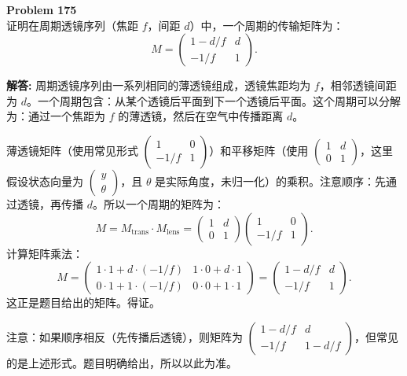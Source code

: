 \documentclass[12pt, a4paper, oneside]{ctexart}
\newenvironment{solution}{\par\noindent\textbf{解答:}\quad}{\par}
\begin{document}
\begin{mdframed}[backgroundcolor=gray!10, linewidth=0pt]
    \textbf{Problem 175} \\
    证明在周期透镜序列（焦距 $f$，间距 $d$）中，一个周期的传输矩阵为：
    \[
    M = \begin{pmatrix} 1 - d/f & d \\ -1/f & 1 \end{pmatrix}.
    \]
\end{mdframed}
\begin{solution}
    周期透镜序列由一系列相同的薄透镜组成，透镜焦距均为 $f$，相邻透镜间距为 $d$。一个周期包含：从某个透镜后平面到下一个透镜后平面。这个周期可以分解为：通过一个焦距为 $f$ 的薄透镜，然后在空气中传播距离 $d$。

    薄透镜矩阵（使用常见形式 $\begin{pmatrix} 1 & 0 \\ -1/f & 1 \end{pmatrix}$）和平移矩阵（使用 $\begin{pmatrix} 1 & d \\ 0 & 1 \end{pmatrix}$，这里假设状态向量为 $\begin{pmatrix} y \\ \theta \end{pmatrix}$，且 $\theta$ 是实际角度，未归一化）的乘积。注意顺序：先通过透镜，再传播 $d$。所以一个周期的矩阵为：
    \[
    M = M_{\text{trans}} \cdot M_{\text{lens}} = \begin{pmatrix} 1 & d \\ 0 & 1 \end{pmatrix} \begin{pmatrix} 1 & 0 \\ -1/f & 1 \end{pmatrix}.
    \]
    计算矩阵乘法：
    \[
    M = \begin{pmatrix} 1 \cdot 1 + d \cdot (-1/f) & 1 \cdot 0 + d \cdot 1 \\ 0 \cdot 1 + 1 \cdot (-1/f) & 0 \cdot 0 + 1 \cdot 1 \end{pmatrix} = \begin{pmatrix} 1 - d/f & d \\ -1/f & 1 \end{pmatrix}.
    \]
    这正是题目给出的矩阵。得证。

    注意：如果顺序相反（先传播后透镜），则矩阵为 $\begin{pmatrix} 1 - d/f & d \\ -1/f & 1 - d/f \end{pmatrix}$，但常见的是上述形式。题目明确给出，所以以此为准。
\end{solution}
\end{document}
